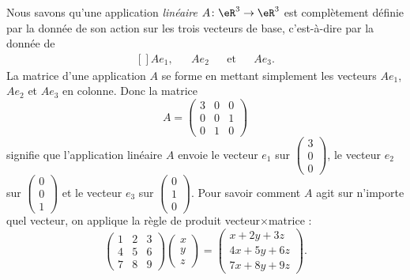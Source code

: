 Nous savons qu'une application \emph{linéaire} $A\colon \eR^3\to \eR^3$ est complètement définie par la donnée de son action sur les trois vecteurs de base, c'est-à-dire par la donnée de
\begin{equation}
	\begin{aligned}[]
		Ae_1,&&Ae_2&&\text{et}&&Ae_3.
	\end{aligned}
\end{equation}
La matrice d'une application $A$ se forme en mettant simplement les vecteurs $Ae_1$, $Ae_2$ et $Ae_3$ en colonne. Donc la matrice
\begin{equation}		\label{EqExempleALin}
	A=\begin{pmatrix}
		3	&	0	&	0	\\
		0	&	0	&	1	\\
		0	&	1	&	0
	\end{pmatrix}
\end{equation}
signifie que l'application linéaire $A$ envoie le vecteur $e_1$ sur $\begin{pmatrix}
	3	\\
	0	\\
	0
\end{pmatrix}$, le vecteur $e_2$ sur $\begin{pmatrix}
	0	\\
	0	\\
	1
\end{pmatrix}$ et le vecteur $e_3$ sur $\begin{pmatrix}
	0	\\
	1	\\
	0
\end{pmatrix}$.
Pour savoir comment $A$ agit sur n'importe quel vecteur, on applique la règle de produit vecteur$\times$matrice :
\begin{equation}
	\begin{pmatrix}
		1	&	2	&	3	\\
		4	&	5	&	6	\\
		7	&	8	&	9
	\end{pmatrix}\begin{pmatrix}
		x	\\
		y	\\
		z
	\end{pmatrix}=
	\begin{pmatrix}
		 x+2y+3z	\\
		4x+5y+6z	\\
		7x+8y+9z
	\end{pmatrix}.
\end{equation}

